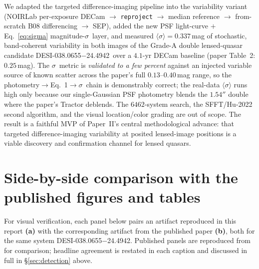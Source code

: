 \documentclass[11pt,letterpaper]{article}
\newcommand{\sig}{\ensuremath{\sigma}}
\newcommand{\meansig}{\ensuremath{\langle\sigma\rangle}}
\newcommand{\target}{DESI-038.0655$-$24.4942}
\begin{document}
We adapted the \citet{sheu2023lensedsne} targeted difference-imaging pipeline
into the \citet{sheu2024variable} variability variant (NOIRLab per-exposure
DECam $\to$ \texttt{reproject} $\to$ median reference $\to$ from-scratch B08
differencing $\to$ SEP), added the new PSF light-curve $+$ Eq.~\ref{eq:sigma}
magnitude-\sig\ layer, and measured $\meansig = 0.337$\,mag of stochastic,
band-coherent variability in both images of the Grade-A double lensed-quasar
candidate \target\ over a $4.1$-yr DECam baseline (paper Table~2:
$0.25$\,mag). The \sig\ metric is \emph{validated to a few percent} against an
injected variable source of known scatter across the paper's full
$0.13$--$0.40$\,mag range, so the photometry$\to$Eq.~1$\to$\sig\ chain is
demonstrably correct; the real-data $\meansig$ runs high only because our
single-Gaussian PSF photometry blends the $1.54''$ double where the paper's
Tractor deblends. The $6462$-system search, the SFFT/Hu-2022 second algorithm,
and the visual location/color grading are out of scope. The result is a
faithful MVP of Paper~II's central methodological advance: that targeted
difference-imaging variability at posited lensed-image positions is a viable
discovery and confirmation channel for lensed quasars.

\appendix
\section{Side-by-side comparison with the published figures and tables}
\label{app:compare}

For visual verification, each panel below pairs an artifact reproduced in this
report \textbf{(a)} with the corresponding artifact from the published paper
\textbf{(b)}, both for the same system \target. Published panels are reproduced
from \citet{sheu2024variable} for comparison; headline agreement is restated in
each caption and discussed in full in \S\ref{sec:detection} above.
\end{document}
